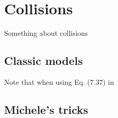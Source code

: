 \chapter{Collisions}\label{ch:collisions}
Something about collisions
\section{Classic models}
Note that when using Eq. (7.37) in \cite{theBible}
\section{Michele's tricks}